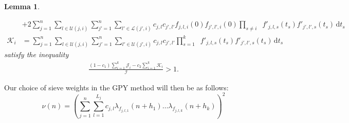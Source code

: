 \documentclass{amsart}
\newtheorem{lemma}{Lemma}
\numberwithin{equation}{section}
\begin{document}
\begin{lemma}
\begin{enumerate}[{\rm(1)}]
\begin{align*}
&+2\sum_{j=1}^n \sum_{l \in  \mathcal{U}(j,i)}  \sum_{j'=1}^n  \sum_{l' \in  \mathcal{L}(j',i)} c_{j,l}c_{j',l'} f_{j,l,i}(0)  f_{j',l',i}(0)  \prod_{s\neq i} \mathop{\int_0^\infty   }  f'_{j,l,s}(t_s)     f'_{j',l',s}(t_s)   \, \mbox{d}t_s\\
\mathcal{K}_i&=\sum_{j=1}^n \sum_{l \in  \mathcal{U}(j,i)}  \sum_{j'=1}^n  \sum_{l' \in  \mathcal{U}(j',i)}  c_{j,l}c_{j',l'}   \prod_{s=1}^k \mathop{\int_0^\infty} f'_{j,l,s}(t_s)     f'_{j',l',s}(t_s)    \, \mbox{d}t_s
\end{align*}
satisfy the inequality 
\begin{align*}
\frac{(1-c_1) \sum_{i=1}^k  \mathcal{J}_i - c_2 \sum_{i=1}^k  \mathcal{K}_i}{ \mathcal{I}} > 1.
\end{align*}
\end{enumerate}

\end{lemma}

Our choice of sieve weights in the GPY method will then be as follows:
 $$\nu(n)=\left(\sum_{j=1}^n\sum_{l=1}^{L_j} c_{j,l} \lambda_{f_{j,l,1}}(n+h_1) \dots \lambda_{f_{j,l,k}}(n+h_k)  \right)^2$$    
\end{document}
